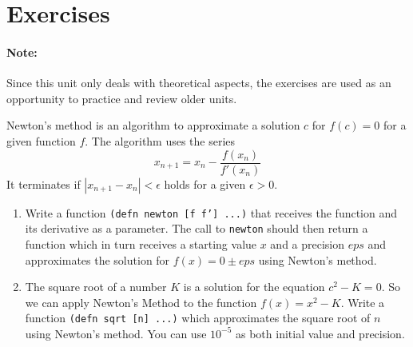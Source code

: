 \documentclass[11pt,a4paper]{article}
\begin{document}
\section{Exercises}

\paragraph{Note:} Since this unit only deals with theoretical aspects, the exercises are used as an opportunity to practice and review older units.

\begin{exercise}
Newton's method is an algorithm to approximate a solution $c$ for $f(c)=0$ for a given function $f$.
The algorithm uses the series $$x_{n+1} = x_{n} - \frac{f(x_n)}{f'(x_n)}$$
It terminates if  $|x_{n+1} - x_n| < \epsilon$ holds for a given $\epsilon > 0$.

\begin{enumerate}[label=\alph*)]

  \item Write a function \texttt{(defn newton [f f'] ...)} that receives the function and its derivative as a parameter. The call to \texttt{newton} should then return a function which in turn receives a starting value $x$ and a precision $eps$ and approximates the solution for $f(x)=0 \pm eps$ using Newton's method.
  
   \item The square root of a number $K$ is a solution for the equation $c^2 - K = 0$. So we can apply Newton's Method to the function $f(x) = x^2 - K$. Write a function \texttt{(defn sqrt [n] ...)} which approximates the square root of $n$ using Newton's method. You can use $10^{-5}$ as both initial value and precision.
    


\end{enumerate}
\end{exercise}
\end{document}
